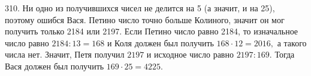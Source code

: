310. Ни одно из получившихся чисел не делится на 5 (а значит, и на 25), поэтому ошибся Вася. Петино число точно больше Колиного, значит он мог получить только 2184 или 2197. Если Петино число равно 2184, то изначальное число равно $2184:13=168$ и Коля должен был получить $168\cdot12=2016,$ а такого числа нет. Значит, Петя получил $2197$ и исходное число равно $2197:169.$ Тогда Вася должен был получить $169\cdot25=4225.$\\

